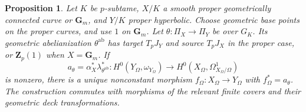 \documentclass[11pt,a4paper]{article}
\numberwithin{equation}{section}
\theoremstyle{plain}
\newtheorem{proposition}[theorem]{Proposition}
\theoremstyle{definition}
\theoremstyle{remark}
\newcommand{\Zp}{\mathbf Z_p}
\newcommand{\Gm}{\mathbf G_m}
\newcommand{\ab}{\mathrm{ab}}
\begin{document}
\begin{proposition}
\label{prop:geometric-map}
Let $K$ be $p$-subtame, $X/K$ a smooth proper geometrically connected
curve or $\Gm$, and $Y/K$ proper hyperbolic. Choose geometric base
points on the proper curves, and use $1$ on $\Gm$.
Let $\theta:\Pi_X\to\Pi_Y$ be over $G_K$.
Its geometric abelianization $\theta^{\ab}$ has target $T_pJ_Y$ and
source $T_pJ_X$ in the proper case, or $\Zp(1)$ when $X=\Gm$.
If
\[
 a_\theta=\alpha_X^*\lambda_{\theta^{\ab}}^*:
 H^0(Y_\Omega,\omega_{Y_\Omega})\longrightarrow
 H^0(X_\Omega,\Omega^1_{X_\Omega/\Omega})
\]
is nonzero, there is a unique nonconstant morphism
$f_\Omega:X_\Omega\to Y_\Omega$ with $f_\Omega^*=a_\theta$.
The construction commutes with morphisms of the relevant finite covers
and their geometric deck transformations.
\end{proposition}
\end{document}
